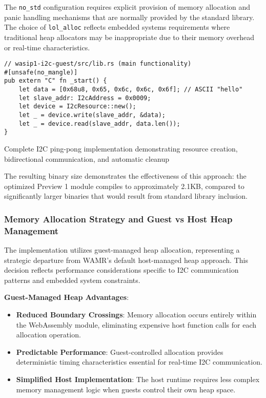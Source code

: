The \texttt{no\_std} configuration requires explicit provision of memory allocation and panic handling mechanisms that are normally provided by the standard library. The choice of \texttt{lol\_alloc} reflects embedded systems requirements where traditional heap allocators may be inappropriate due to their memory overhead or real-time characteristics.

\begin{listing}[H]
\begin{verbatim}
// wasip1-i2c-guest/src/lib.rs (main functionality)
#[unsafe(no_mangle)]
pub extern "C" fn _start() {
    let data = [0x68u8, 0x65, 0x6c, 0x6c, 0x6f]; // ASCII "hello"
    let slave_addr: I2cAddress = 0x0009;
    let device = I2cResource::new();
    let _ = device.write(slave_addr, &data);
    let _ = device.read(slave_addr, data.len());
}
\end{verbatim}
\caption{Complete I2C ping-pong implementation demonstrating resource creation, bidirectional communication, and automatic cleanup}
\label{lst:preview1-main-functionality}
\end{listing}

The resulting binary size demonstrates the effectiveness of this approach: the optimized Preview 1 module compiles to approximately 2.1KB, compared to significantly larger binaries that would result from standard library inclusion.

\subsubsection{Memory Allocation Strategy and Guest vs Host Heap Management}

The implementation utilizes guest-managed heap allocation, representing a strategic departure from WAMR's default host-managed heap approach. This decision reflects performance considerations specific to I2C communication patterns and embedded system constraints.

\textbf{Guest-Managed Heap Advantages}:
\begin{itemize}
    \item \textbf{Reduced Boundary Crossings}: Memory allocation occurs entirely within the WebAssembly module, eliminating expensive host function calls for each allocation operation.
    \item \textbf{Predictable Performance}: Guest-controlled allocation provides deterministic timing characteristics essential for real-time I2C communication.
    \item \textbf{Simplified Host Implementation}: The host runtime requires less complex memory management logic when guests control their own heap space.
\end{itemize}

